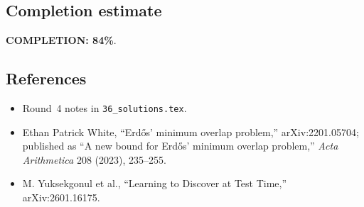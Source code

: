 \subsection{Completion estimate}
\textbf{COMPLETION: 84\%}.

\subsection{References}
\begin{itemize}
\item Round~4 notes in \texttt{36\_solutions.tex}.
\item Ethan Patrick White, ``Erd\H{o}s' minimum overlap problem,'' arXiv:2201.05704; published as ``A new bound for Erd\H{o}s' minimum overlap problem,'' \emph{Acta Arithmetica} 208 (2023), 235--255.
\item M. Yuksekgonul et al., ``Learning to Discover at Test Time,'' arXiv:2601.16175.
\end{itemize}
